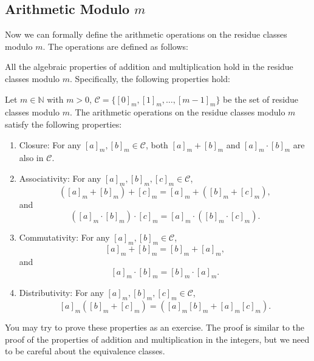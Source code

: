 \documentclass[oneside]{book}
\begin{document}
\subsection{Arithmetic Modulo $m$}
Now we can formally define the arithmetic operations on the residue classes modulo \( m \). The operations are defined as follows:

All the algebraic properties of addition and multiplication hold in the residue classes modulo \( m \). Specifically, the following properties hold:

Let \( m \in \mathbb{N} \) with \( m > 0 \), $\mathcal{C} = \{ [0]_m, [1]_m, \dots, [m-1]_m \}$ be the set of residue classes modulo \( m \). The arithmetic operations on the residue classes modulo \( m \) satisfy the following properties:
\begin{enumerate}
	\item Closure: For any \( [a]_m, [b]_m \in \mathcal{C} \), both \( [a]_m + [b]_m \) and \( [a]_m \cdot [b]_m \) are also in \( \mathcal{C} \).
	\item Associativity: For any \( [a]_m, [b]_m, [c]_m \in \mathcal{C} \),
	      \[
		      ([a]_m + [b]_m) + [c]_m = [a]_m + ([b]_m + [c]_m),
	      \]
	      and
	      \[
		      ([a]_m \cdot [b]_m) \cdot [c]_m = [a]_m \cdot ([b]_m \cdot [c]_m).
	      \]
	\item Commutativity: For any \( [a]_m, [b]_m \in \mathcal{C} \),
	      \[
		      [a]_m + [b]_m = [b]_m + [a]_m,
	      \]
	      and
	      \[
		      [a]_m \cdot [b]_m = [b]_m \cdot [a]_m.
	      \]
	\item Distributivity: For any \( [a]_m, [b]_m, [c]_m \in \mathcal{C} \),
	      \[
		      [a]_m([b]_m + [c]_m) = ([a]_m[b]_m + [a]_m[c]_m).
	      \]
\end{enumerate}
You may try to prove these properties as an exercise. The proof is similar to the proof of the properties of addition and multiplication in the integers, but we need to be careful about the equivalence classes.
\end{document}
